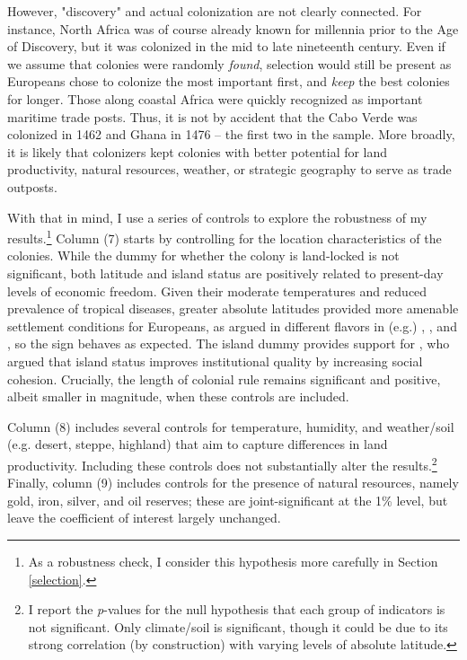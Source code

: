 \documentclass[a4paper,12pt]{article}
\begin{document}
However, "discovery" and actual colonization are not clearly connected. For instance, North Africa was of course already known for millennia prior to the Age of Discovery, but it was colonized in the mid to late nineteenth century. Even if we assume that colonies were randomly \textit{found}, selection would still be present as Europeans chose to colonize the most important first, and \textit{keep} the best colonies for longer. Those along coastal Africa were quickly recognized as important maritime trade posts. Thus, it is not by accident that the Cabo Verde was colonized in 1462 and Ghana in 1476 -- the first two in the sample. More broadly, it is likely that colonizers kept colonies with better potential for land productivity, natural resources, weather, or strategic geography to serve as trade outposts. 

With that in mind, I use a series of controls to explore the robustness of my results.\footnote{As a robustness check, I consider this hypothesis more carefully in Section \ref{selection}.} Column (7) starts by controlling for the location characteristics of the colonies. While the dummy for whether the colony is land-locked is not significant, both latitude and island status are positively related to present-day levels of economic freedom. Given their moderate temperatures and reduced prevalence of tropical diseases, greater absolute latitudes provided more amenable settlement conditions for Europeans, as argued in different flavors in (e.g.) \cite{hall1999some}, \cite{Acemoglu2001}, and \cite{bennett2017economic}, so the sign behaves as expected. The island dummy provides support for \cite{fors2014island}, who argued that island status improves institutional quality by increasing social cohesion. Crucially, the length of colonial rule remains significant and positive, albeit smaller in magnitude, when these controls are included. 

Column (8) includes several controls for temperature, humidity, and weather/soil (e.g. desert, steppe, highland) that aim to capture differences in land productivity. Including these controls does not substantially alter the results.\footnote{I report the \textit{p}-values for the null hypothesis that each group of indicators is not significant. Only climate/soil is significant, though it could be due to its strong correlation (by construction) with varying levels of absolute latitude.} Finally, column (9) includes controls for the presence of natural resources, namely gold, iron, silver, and oil reserves; these are joint-significant at the 1\% level, but leave the coefficient of interest largely unchanged.  
\end{document}
